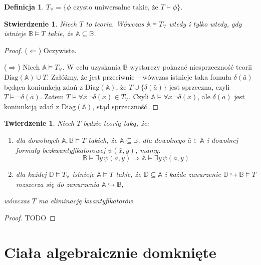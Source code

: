 \documentclass{article}
\newcommand{\A}{\mathbb{A}}
\newcommand{\B}{\mathbb{B}}
\newcommand{\D}{\mathbb{D}}
\theoremstyle{plain}
\newtheorem{tw}[thm]{Twierdzenie}
\newtheorem{stw}[thm]{Stwierdzenie}
\theoremstyle{definition}
\newtheorem{df}[thm]{Definicja}
\theoremstyle{remark}
\newcommand{\wtw}{wtedy i tylko wtedy, gdy }
\newcommand{\Diag}{\text{Diag}}
\begin{document}

\begin{df}
	$T_{\forall} = \{\phi \text{ czysto uniwersalne takie, że } T \vdash
	\phi\}$.
\end{df}

\begin{stw}
	Niech $T$ to teoria. Wówczas $\A \models T_{\forall}$ \wtw istnieje $\B
	\models T$ takie, że $\A \subseteq \B$.
\end{stw}
\begin{proof}
	($\Leftarrow$) Oczywiste.

	($\Rightarrow$) Niech $\A \models T_{\forall}$. W celu uzyskania
	$\B$ wystarczy pokazać niesprzeczność teorii $\Diag(\A) \cup T$.
	Załóżmy, że jest przeciwnie -- wówczas istnieje taka fomuła
	$\delta(\bar{a})$ będąca koniunkcją zdań z $\Diag(\A)$, że $T \cup
	\{\delta(\bar{a})\}$ jest sprzeczna, czyli $T \models \neg
	\delta(\bar{a})$. Zatem $T \models \forall \bar{x} \, \neg
	\delta(\bar{x}) \in T_{\forall}$. Czyli $\A \models \forall \bar{x} \,
	\neg \delta(\bar{x})$, ale $\delta(\bar{a})$ jest koniunkcją zdań z
	$\Diag(\A)$, stąd sprzeczność.
\end{proof}

\begin{tw}
	\label{tw:qe}
	Niech $T$ będzie teorią taką, że:
	\begin{enumerate}
		\item dla dowolnych $\A, \B \models T$ takich, że $\A \subseteq
			\B$, dla dowolnego $\bar{a} \in \A$ i dowolnej formuły
			bezkwantyfikatorowej $\psi(\bar{x}, y)$, mamy:
			\[
				\B \models \exists y \, \psi(\bar{a}, y)
				\Rightarrow \A \models
				\exists y \, \psi(\bar{a}, y)
			\]
		\item dla każdej $\D \models T_{\forall}$ istnieje $\A \models
			T$ takie, że $\D \subseteq \A$ i każde zanurzenie $\D
			\hookrightarrow \B \models T$ rozszerza się do
			zanurzenia $\A \hookrightarrow \B$,
	\end{enumerate}
	wówczas $T$ ma eliminację kwantyfikatorów.
\end{tw}
\begin{proof}
	\color{red} TODO
\end{proof}



\section{Ciała algebraicznie domknięte}
\end{document}
